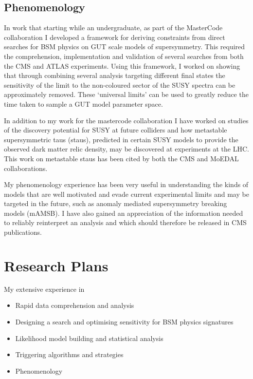 \documentclass[11pt]{article}
\theoremstyle{plain} \numberwithin{equation}{section}
\theoremstyle{definition}
\begin{document}
\subsection*{Phenomenology}
In work that starting while an undergraduate, as part of the MasterCode collaboration I developed a framework for 
deriving constraints from direct searches for BSM physics on GUT scale models of supersymmetry. 
This required the comprehension, implementation and validation of several 
searches from both the CMS and ATLAS experiments. Using this framework, I worked on
showing that through combining several analysis targeting different final states the sensitivity of the 
limit to the non-coloured sector of the SUSY spectra can be approximately removed. 
These `universal limits' can be used to greatly reduce the 
time taken to sample a GUT model parameter space. 

In addition to my work for the mastercode collaboration I have worked on 
studies of the discovery potential for SUSY at future colliders and how 
metastable supersymmetric taus (staus), predicted in certain SUSY models to provide the observed
dark matter relic density, may be discovered at experiments at the LHC. 
This work on metastable staus has been cited by both the CMS and MoEDAL collaborations.

My phenomenology experience has been very useful in understanding
the kinds of models that are well motivated and evade current experimental limits and may be targeted in the 
future, such as anomaly mediated supersymmetry breaking models (mAMSB). I have also gained an appreciation
of the information needed to reliably reinterpret an analysis and which should therefore be released in CMS publications.

\section*{Research Plans}

My extensive experience in

\begin{itemize}
\item Rapid data comprehension and analysis
\item Designing a search and optimising sensitivity for BSM physics signatures
\item Likelihood model building and statistical analysis 
\item Triggering algorithms and strategies
\item Phenomenology
\end{itemize}
\end{document}
